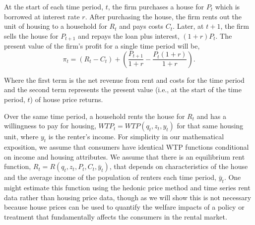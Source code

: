 \documentclass[ecta,nameyear,draft]{econsocart}
\theoremstyle{plain}
\theoremstyle{remark}
\begin{document}
At the start of each time period, $t$, the firm purchases a house for $P_t$ which is borrowed at interest rate $r$. After purchasing the house, the firm rents out the unit of housing to a household for $R_t$ and pays costs $C_t$. Later, at $t+1$, the firm sells the house for $P_{t+1}$ and repays the loan plus interest, $(1 + r)P_t$.  The present value of the firm’s profit for a single time period will be,
\begin{equation}
\pi_t = (R_t-C_t)+\left(\frac{P_{t+1}}{1+r}-\frac{P_t(1+r)}{1+r}\right).\label{pi1}
\end{equation}

Where the first term is the net revenue from rent and costs for the time period and the second term
represents the present value (i.e., at the start of the time period, $t$) of house price returns.

Over the same time period, a household rents the house for $R_t$ and has a willingness to pay for housing, $\mathit{WTP}_t=\mathit{WTP}(q_t,z_t,y_t)$ for that same housing unit, where $y_t$ is the renter's income. For simplicity in our mathematical exposition, we assume that consumers have identical WTP functions conditional on income and housing attributes. We  assume that there is an equilibrium rent function, $R_t=R(q_t,z_t,P_t,C_t,\bar{y}_t)$, that depends on characteristics of the house and the average income of the population of renters each time period, $\bar{y}_t$. One might estimate this function using the hedonic price method and time series rent data rather than housing price data, though as we will show this is not necessary because house prices can be used to quantify the welfare impacts of a policy or treatment that fundamentally affects the consumers in the rental market. 
\end{document}
